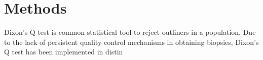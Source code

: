 \chapter{Methods}

Dixon's Q test is common statistical tool to reject outliners in a population. Due to the lack of persistent quality control mechanisms in obtaining biopsies, Dixon's Q test has been implemented in distin
